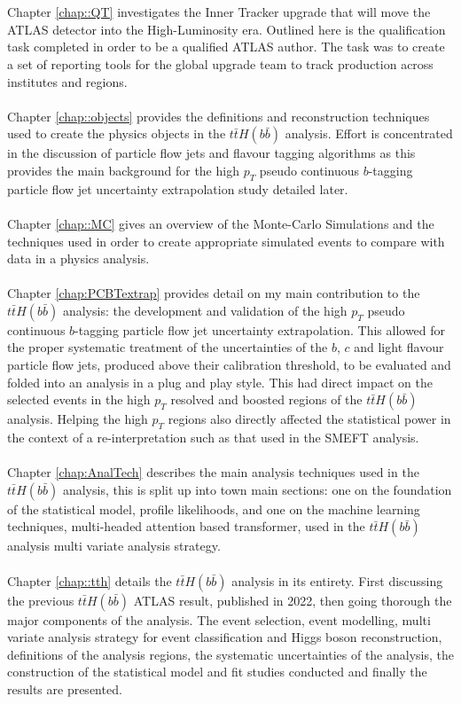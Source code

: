 \\
\\
Chapter \ref{chap::QT} investigates the Inner Tracker upgrade that will move the ATLAS detector into the High-Luminosity era. Outlined here is the qualification task completed in order to be a qualified ATLAS author. The task was to create a set of reporting tools for the global upgrade team to track production across institutes and regions.
\\
\\
Chapter \ref{chap::objects} provides the definitions and reconstruction techniques used to create the physics objects in the $t\bar{t}H(b\bar{b})$ analysis. Effort is concentrated in the discussion of particle flow jets and flavour tagging algorithms as this provides the main background for the high $p_T$ pseudo continuous $b$-tagging particle flow jet uncertainty extrapolation study detailed later.
\\
\\
Chapter \ref{chap::MC} gives an overview of the Monte-Carlo Simulations and the techniques used in order to create appropriate simulated events to compare with data in a physics analysis. 
\\
\\
Chapter \ref{chap:PCBTextrap} provides detail on my main contribution to the $t\bar{t}H(b\bar{b})$ analysis: the development and validation of the high $p_T$ pseudo continuous $b$-tagging particle flow jet uncertainty extrapolation. This allowed for the proper systematic treatment of the uncertainties of the $b$, $c$ and light flavour particle flow jets, produced above their calibration threshold, to be evaluated and folded into an analysis in a plug and play style. This had direct impact on the selected events in the high $p_T$ resolved and boosted regions of the $t\bar{t}H(b\bar{b})$ analysis. Helping the high $p_T$ regions also directly affected the statistical power in the context of a re-interpretation such as that used in the SMEFT analysis.
\\
\\
Chapter \ref{chap:AnalTech} describes the main analysis techniques used in the $t\bar{t}H(b\bar{b})$ analysis, this is split up into town main sections: one on the foundation of the statistical model, profile likelihoods, and one on the machine learning techniques, multi-headed attention based transformer, used in the $t\bar{t}H(b\bar{b})$ analysis multi variate analysis strategy.
\\
\\
Chapter \ref{chap::tth} details the $t\bar{t}H(b\bar{b})$ analysis in its entirety. First discussing the previous $t\bar{t}H(b\bar{b})$ ATLAS result, published in 2022, then going thorough the major components of the analysis. The event selection, event modelling, multi variate analysis strategy for event classification and Higgs boson reconstruction, definitions of the analysis regions, the systematic uncertainties of the analysis, the construction of the statistical model and fit studies conducted and finally the results are presented.
